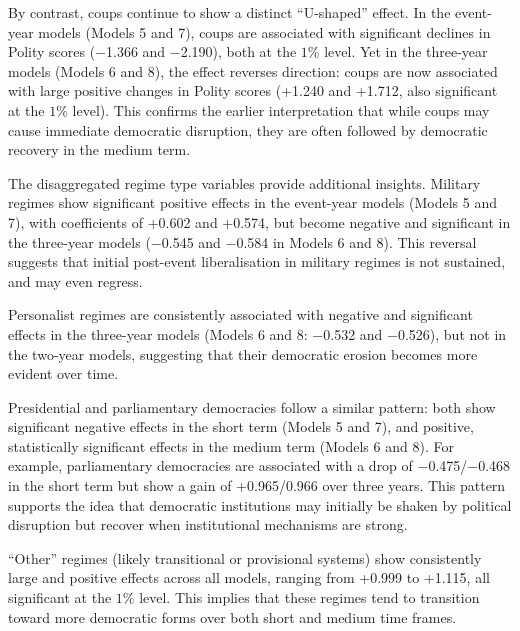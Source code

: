 \documentclass[
  12pt,
]{report}
\begin{document}
By contrast, coups continue to show a distinct ``U-shaped'' effect. In
the event-year models (Models 5 and 7), coups are associated with
significant declines in Polity scores (−1.366 and −2.190), both at the
\(1\%\) level. Yet in the three-year models (Models 6 and 8), the effect
reverses direction: coups are now associated with large positive changes
in Polity scores (+1.240 and +1.712, also significant at the \(1\%\)
level). This confirms the earlier interpretation that while coups may
cause immediate democratic disruption, they are often followed by
democratic recovery in the medium term.

The disaggregated regime type variables provide additional insights.
Military regimes show significant positive effects in the event-year
models (Models 5 and 7), with coefficients of +0.602 and +0.574, but
become negative and significant in the three-year models (−0.545 and
−0.584 in Models 6 and 8). This reversal suggests that initial
post-event liberalisation in military regimes is not sustained, and may
even regress.

Personalist regimes are consistently associated with negative and
significant effects in the three-year models (Models 6 and 8: −0.532 and
−0.526), but not in the two-year models, suggesting that their
democratic erosion becomes more evident over time.

Presidential and parliamentary democracies follow a similar pattern:
both show significant negative effects in the short term (Models 5 and
7), and positive, statistically significant effects in the medium term
(Models 6 and 8). For example, parliamentary democracies are associated
with a drop of −0.475/−0.468 in the short term but show a gain of
+0.965/0.966 over three years. This pattern supports the idea that
democratic institutions may initially be shaken by political disruption
but recover when institutional mechanisms are strong.

``Other'' regimes (likely transitional or provisional systems) show
consistently large and positive effects across all models, ranging from
+0.999 to +1.115, all significant at the \(1\%\) level. This implies
that these regimes tend to transition toward more democratic forms over
both short and medium time frames.
\end{document}
